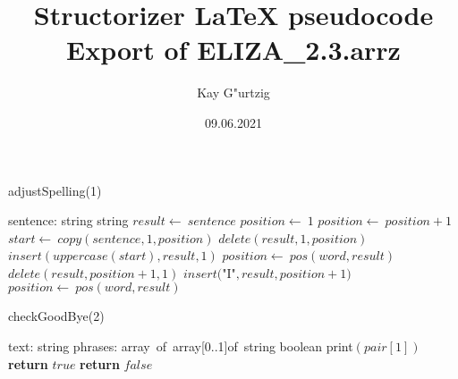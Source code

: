 \documentclass[a4paper,10pt]{article}
\title{Structorizer LaTeX pseudocode Export of ELIZA\_2.3.arrz}
\author{Kay G"urtzig}
\date{09.06.2021}
\begin{document}
\begin{algorithm}
\caption{adjustSpelling(1)}
\begin{algorithmic}[5]
\State {}
    \State sentence: string
  \EndDecl
    \State string
  \EndDecl
  \State \(result\gets\ sentence\)
  \State \(position\gets\ 1\)
    \State \(position\gets\ position+1\)
  \EndWhile
    \State \(start\gets\ copy(sentence,1,position)\)
    \State \(delete(result,1,position)\)
    \State \(insert(uppercase(start),result,1)\)
  \EndIf
    \State \(position\gets\ pos(word,result)\)
      \State \(delete(result,position+1,1)\)
      \State \(insert(\)"{}I"{}\(,result,position+1)\)
      \State \(position\gets\ pos(word,result)\)
    \EndWhile
  \EndFor
\EndFunction
\end{algorithmic}
\end{algorithm}


\begin{algorithm}
\caption{checkGoodBye(2)}
\begin{algorithmic}[5]
\State {}
\State {}
\State {}
\State {}
    \State text: string
    \State phrases: array\ of\ array[0..1]of\ string
  \EndDecl
    \State boolean
  \EndDecl
      \State \(\)print\((pair[1])\)
      \State \textbf{return} \(true\)
    \EndIf
  \EndFor
  \State \textbf{return} \(false\)
\EndFunction
\end{algorithmic}
\end{algorithm}
\end{document}
